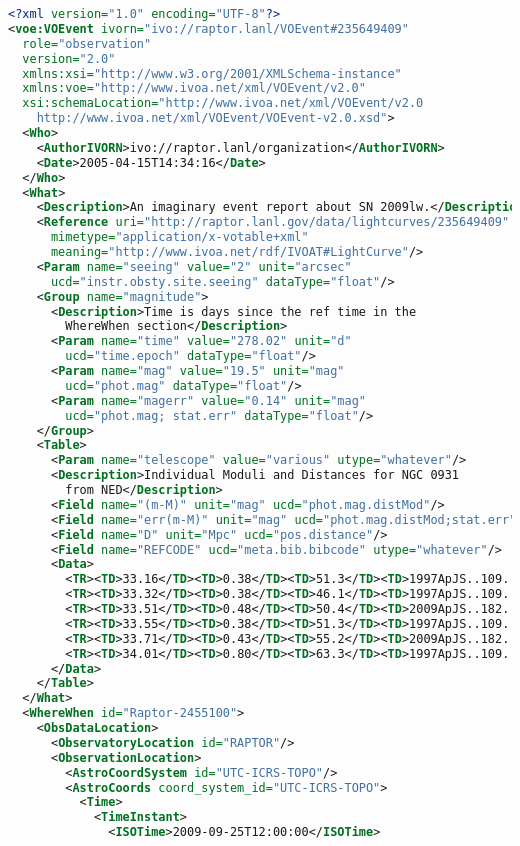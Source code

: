\documentclass[11pt,a4paper]{ivoa}
\begin{document}
\begin{lstlisting}[language=XML]
<?xml version="1.0" encoding="UTF-8"?>
<voe:VOEvent ivorn="ivo://raptor.lanl/VOEvent#235649409" 
  role="observation" 
  version="2.0"
  xmlns:xsi="http://www.w3.org/2001/XMLSchema-instance"
  xmlns:voe="http://www.ivoa.net/xml/VOEvent/v2.0"
  xsi:schemaLocation="http://www.ivoa.net/xml/VOEvent/v2.0
    http://www.ivoa.net/xml/VOEvent/VOEvent-v2.0.xsd">
  <Who>
    <AuthorIVORN>ivo://raptor.lanl/organization</AuthorIVORN>
    <Date>2005-04-15T14:34:16</Date>
  </Who>
  <What>
    <Description>An imaginary event report about SN 2009lw.</Description>
    <Reference uri="http://raptor.lanl.gov/data/lightcurves/235649409"
      mimetype="application/x-votable+xml"
      meaning="http://www.ivoa.net/rdf/IVOAT#LightCurve"/>
    <Param name="seeing" value="2" unit="arcsec"
      ucd="instr.obsty.site.seeing" dataType="float"/>
    <Group name="magnitude">
      <Description>Time is days since the ref time in the
        WhereWhen section</Description>
      <Param name="time" value="278.02" unit="d"
        ucd="time.epoch" dataType="float"/>
      <Param name="mag" value="19.5" unit="mag"
        ucd="phot.mag" dataType="float"/>
      <Param name="magerr" value="0.14" unit="mag"
        ucd="phot.mag; stat.err" dataType="float"/>
    </Group>
    <Table>
      <Param name="telescope" value="various" utype="whatever"/>
      <Description>Individual Moduli and Distances for NGC 0931
        from NED</Description>
      <Field name="(m-M)" unit="mag" ucd="phot.mag.distMod"/>
      <Field name="err(m-M)" unit="mag" ucd="phot.mag.distMod;stat.err"/>
      <Field name="D" unit="Mpc" ucd="pos.distance"/>
      <Field name="REFCODE" ucd="meta.bib.bibcode" utype="whatever"/>
      <Data>
        <TR><TD>33.16</TD><TD>0.38</TD><TD>51.3</TD><TD>1997ApJS..109..333W</TD></TR>
        <TR><TD>33.32</TD><TD>0.38</TD><TD>46.1</TD><TD>1997ApJS..109..333W</TD></TR>
        <TR><TD>33.51</TD><TD>0.48</TD><TD>50.4</TD><TD>2009ApJS..182..474S</TD></TR>
        <TR><TD>33.55</TD><TD>0.38</TD><TD>51.3</TD><TD>1997ApJS..109..333W</TD></TR>
        <TR><TD>33.71</TD><TD>0.43</TD><TD>55.2</TD><TD>2009ApJS..182..474S</TD></TR>
        <TR><TD>34.01</TD><TD>0.80</TD><TD>63.3</TD><TD>1997ApJS..109..333W</TD></TR>
      </Data>
    </Table>
  </What>
  <WhereWhen id="Raptor-2455100">
    <ObsDataLocation>
      <ObservatoryLocation id="RAPTOR"/>
      <ObservationLocation>
        <AstroCoordSystem id="UTC-ICRS-TOPO"/>
        <AstroCoords coord_system_id="UTC-ICRS-TOPO">
          <Time>
            <TimeInstant>
              <ISOTime>2009-09-25T12:00:00</ISOTime>

\end{lstlisting}
\end{document}
